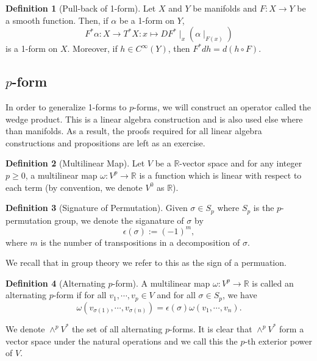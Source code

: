\documentclass[]{article}
\theoremstyle{definition}
\theoremstyle{definition}
\newtheorem{definition}{Definition}[section]
\begin{document}
\begin{definition}[Pull-back of 1-form]
  Let \(X\) and \(Y\) be manifolds and \(F : X \to Y\) be a smooth function. 
  Then, if \(\alpha\) be a 1-form on \(Y\), 
  \[F^*\alpha : X \to T^* X : x \mapsto DF^* \mid_x (\alpha\mid_{F(x)})\]
  is a 1-form on \(X\). Moreover, if \(h \in C^\infty(Y)\), then 
  \(F^*dh = d(h \circ F)\).
\end{definition}

\subsection{\(p\)-form}

In order to generalize 1-forms to \(p\)-forms, we will construct an operator 
called the wedge product. This is a linear algebra construction and is also used 
else where than manifolds. As a result, the proofs required for 
all linear algebra constructions and propositions are left as an exercise.

\begin{definition}[Multilinear Map]
  Let \(V\) be a \(\mathbb{R}\)-vector space and for any integer \(p \ge 0\), 
  a multilinear map \(\omega : V^p \to \mathbb{R}\) is a function which is 
  linear with respect to each term (by convention, we denote \(V^0\) as \(\mathbb{R}\)). 
\end{definition}

\begin{definition}[Signature of Permutation]
  Given \(\sigma \in S_p\) where \(S_p\) is the \(p\)-permutation group, 
  we denote the siganature of \(\sigma\) by 
  \[\epsilon(\sigma) := (-1)^m,\]
  where \(m\) is the number of transpositions in a decomposition of \(\sigma\).

  We recall that in group theory we refer to this as the sign of a permuation.
\end{definition}

\begin{definition}[Alternating \(p\)-form]
  A multilinear map \(\omega : V^p \to \mathbb{R}\) is called an alternating 
  \(p\)-form if for all \(v_1, \cdots, v_p \in V\) and for all \(\sigma \in S_p\), 
  we have 
  \[\omega(v_{\sigma(1)}, \cdots, v_{\sigma(n)}) = \epsilon(\sigma)\omega(v_1, \cdots, v_n).\]

  We denote \(\wedge^p V^*\) the set of all alternating \(p\)-forms. 
  It is clear that \(\wedge^p V^*\) form a vector space under the natural 
  operations and we call this the \(p\)-th exterior power of \(V\).
\end{definition}
\end{document}
